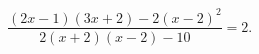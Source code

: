 \begin{ex}[type=equation]
	\begin{condition}
		$\dfrac{(2x - 1)(3x+2) - 2(x-2)^2}{2(x+ 2)(x - 2) -10}=2.$
	\end{condition}
\end{ex}